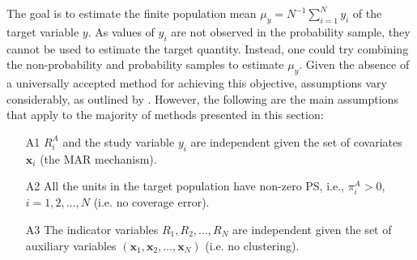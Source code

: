 \documentclass[
]{jss}
\begin{document}
\begin{table}[ht!]
    \centering
    \caption{Two-sample setting}
    \label{tab-two-sources}
\end{table}

The goal is to estimate the finite population mean
\(\mu_y=N^{-1}\sum_{i=1}^{N} y_{i}\) of the target variable \(y\). As
values of \(y_{i}\) are not observed in the probability sample, they
cannot be used to estimate the target quantity. Instead, one could try
combining the non-probability and probability samples to estimate
\(\mu_y\). Given the absence of a universally accepted method for
achieving this objective, assumptions vary considerably, as outlined by
\cite{wu2022statistical}. However, the following are the main
assumptions that apply to the majority of methods presented in this
section:

\begin{itemize}
\item[A1] $R_i^A$ and the study variable $y_i$ are independent given the set of covariates $\boldsymbol{x}_i$ (the MAR mechanism).
\item[A2] All the units in the target population have non-zero PS, i.e., $\pi_i^A>0$, $i=1,2, \ldots, N$ (i.e. no coverage error).
\item[A3] The indicator variables $R_1, R_2, \ldots, R_N$ are independent given the set of auxiliary variables $\left(\boldsymbol{x}_1, \boldsymbol{x}_2, \ldots, \boldsymbol{x}_N\right)$ (i.e. no clustering).
\end{itemize}
\end{document}
